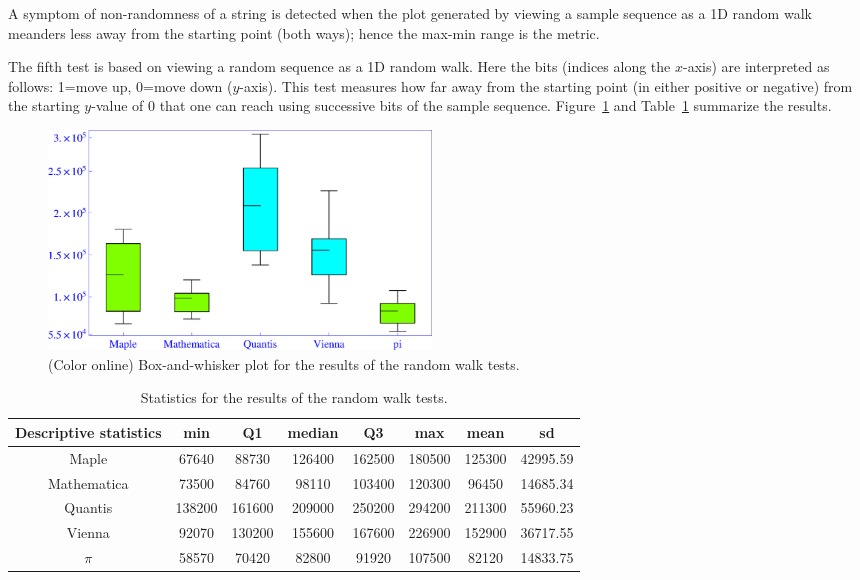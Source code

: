 \documentclass[10pt]{article}%
\begin{document}
A symptom of non-randomness of a string is detected when the plot generated by viewing a sample sequence as
a 1D random walk meanders less  away
from the starting point (both ways); hence the max-min range is the metric.


The fifth test
is based on viewing a  random
sequence as a 1D random walk.  Here the bits (indices along the $x$-axis) are
interpreted as follows: 1=move up, 0=move down ($y$-axis).
This test measures  how far away from the starting point (in either positive
or negative) from the starting $y$-value of 0 that one can reach using
successive bits of the sample sequence.
Figure~\ref{fig:example5} and Table~\ref{tab:5} summarize the results.






\begin{figure}[htbp] %
   \centering
   \includegraphics[width=4in]{2009-QvPR-boxrandomwalk}
   \caption{(Color online) Box-and-whisker plot for the results of the random walk tests.}
   \label{fig:example5}
\end{figure}

\begin{table}
\caption{Statistics for the results of the random walk tests.}\label{tab:5}
\begin{center}
\begin{tabular}
[c]{ c c c c c c c c }%
\hline\hline
Descriptive statistics & min & Q1 & median & Q3 & max & mean & sd\\\hline
Maple & 67640 & 88730 & 126400 & 162500 & 180500 & 125300 & 42995.59\\
Mathematica & 73500 & 84760 & 98110 & 103400 & 120300 & 96450 & 14685.34\\
Quantis  & 138200 & 161600 & 209000 & 250200 & 294200 & 211300 & 55960.23\\
Vienna & 92070 & 130200 & 155600 & 167600 & 226900 & 152900 & 36717.55\\
$\pi$ & 58570 & 70420 & 82800 & 91920 & 107500 & 82120 & 14833.75\\\hline\hline
\end{tabular}
\end{center}
\end{table}
\end{document}
